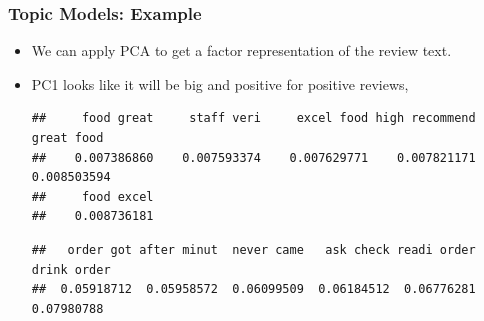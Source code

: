 \documentclass[
  shownotes,
  xcolor={svgnames},
  hyperref={colorlinks,citecolor=DarkBlue,linkcolor=DarkRed,urlcolor=DarkBlue}
  , aspectratio=169]{beamer}
\newenvironment{Shaded}{\begin{snugshade}}{\end{snugshade}}
\newcommand{\CommentTok}[1]{\textcolor[rgb]{0.56,0.35,0.01}{\textit{#1}}}
\newcommand{\DataTypeTok}[1]{\textcolor[rgb]{0.13,0.29,0.53}{#1}}
\newcommand{\DecValTok}[1]{\textcolor[rgb]{0.00,0.00,0.81}{#1}}
\newcommand{\KeywordTok}[1]{\textcolor[rgb]{0.13,0.29,0.53}{\textbf{#1}}}
\newcommand{\NormalTok}[1]{#1}
\newcommand{\OperatorTok}[1]{\textcolor[rgb]{0.81,0.36,0.00}{\textbf{#1}}}
\newcommand{\OtherTok}[1]{\textcolor[rgb]{0.56,0.35,0.01}{#1}}
\newcommand{\StringTok}[1]{\textcolor[rgb]{0.31,0.60,0.02}{#1}}
\begin{document}
\begin{frame}[fragile]
\frametitle{Topic Models: Example}

\begin{itemize}


\item We can apply PCA to get a factor representation of the review text. 
\item  PC1 looks like it will be big and positive for positive reviews, 

\begin{scriptsize}

\begin{Shaded}
\end{Shaded}

\end{scriptsize}
\begin{tiny}

\begin{verbatim}
##     food great     staff veri     excel food high recommend     great food 
##    0.007386860    0.007593374    0.007629771    0.007821171    0.008503594 
##     food excel 
##    0.008736181
\end{verbatim}

\end{tiny}


\begin{tiny}

\begin{verbatim}
##   order got after minut  never came   ask check readi order drink order 
##  0.05918712  0.05958572  0.06099509  0.06184512  0.06776281  0.07980788
\end{verbatim}
\end{tiny}




\end{itemize}
\end{frame}
\end{document}
